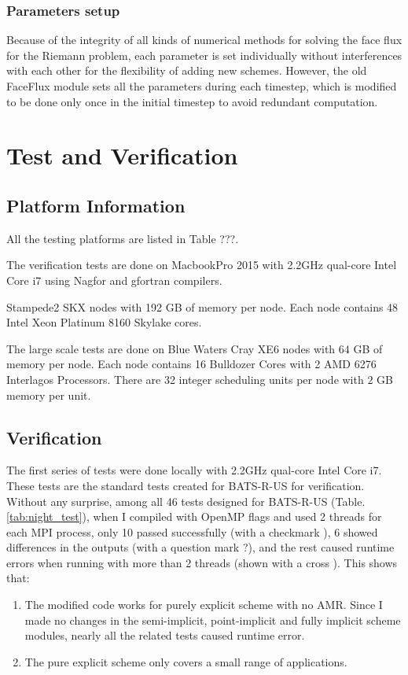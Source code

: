 \documentclass[fleqn,11pt]{SelfArx} %
\begin{document}
\subsubsection{Parameters setup}

Because of the integrity of all kinds of numerical methods for solving the face flux for the Riemann problem, each parameter is set individually without interferences with each other for the flexibility of adding new schemes. However, the old FaceFlux module sets all the parameters during each timestep, which is modified to be done only once in the initial timestep to avoid redundant computation.


\section{Test and Verification}

\subsection{Platform Information}
All the testing platforms are listed in Table ???.

The verification tests are done on MacbookPro 2015 with 2.2GHz qual-core Intel Core i7 using Nagfor and gfortran compilers.

Stampede2 SKX nodes with 192 GB of memory per node. Each node contains 48 Intel Xeon Platinum 8160 Skylake cores. 

The large scale tests are done on Blue Waters Cray XE6 nodes with $64$ GB of memory per node. Each node contains 16 Bulldozer Cores with 2 AMD 6276 Interlagos Processors. There are 32 integer scheduling units per node with $2$ GB memory per unit.




\subsection{Verification}
The first series of tests were done locally with 2.2GHz qual-core Intel Core i7. These tests are the standard tests created for BATS-R-US for verification. Without any surprise, among all 46 tests designed for BATS-R-US (Table.\ref{tab:night_test}), when I compiled with OpenMP flags and used 2 threads for each MPI process, only 10 passed successfully (with a checkmark \checkmark), 6 showed differences in the outputs (with a question mark ?), and the rest caused runtime errors when running with more than 2 threads (shown with a cross ). This shows that:
\begin{enumerate}[noitemsep]
\item The modified code works for purely explicit scheme with no AMR. Since I made no changes in the semi-implicit, point-implicit and fully implicit scheme modules, nearly all the related tests caused runtime error.
\item The pure explicit scheme only covers a small range of applications. 
\end{enumerate}
\end{document}
